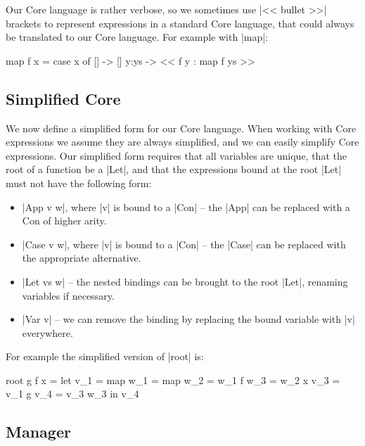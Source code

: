 \documentclass{sigplanconf}
\begin{document}
Our Core language is rather verbose, so we sometimes use |<< bullet >>| brackets to represent expressions in a standard Core language, that could always be translated to our Core language. For example with |map|:

\begin{code}
map f x = case x of
    [] -> []
    y:ys -> << f y : map f ys >>
\end{code}


\subsection{Simplified Core}
\label{sec:simplify}

We now define a simplified form for our Core language. When working with Core expressions we assume they are always simplified, and we can easily simplify Core expressions. Our simplified form requires that all variables are unique, that the root of a function be a |Let|, and that the expressions bound at the root |Let| must not have the following form:

\begin{itemize}
\item |App v w|, where |v| is bound to a |Con| -- the |App| can be replaced with a Con of higher arity.
\item |Case v w|, where |v| is bound to a |Con| -- the |Case| can be replaced with the appropriate alternative.
\item |Let vs w| -- the nested bindings can be brought to the root |Let|, renaming variables if necessary.
\item |Var v| -- we can remove the binding by replacing the bound variable with |v| everywhere.
\end{itemize}


For example the simplified version of |root| is:

\begin{code}
root g f x =  let  v_1 = map
                   w_1 = map
                   w_2 = w_1 f
                   w_3 = w_2 x
                   v_3 = v_1 g
                   v_4 = v_3 w_3
              in   v_4
\end{code}

\subsection{Manager}
\label{sec:manager}
\end{document}
